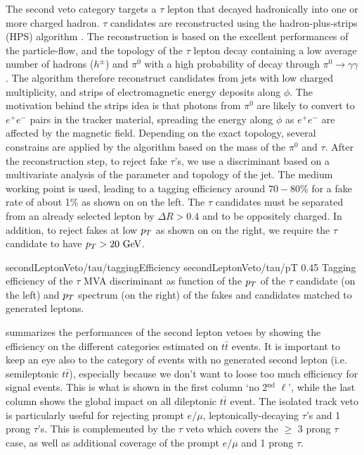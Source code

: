     The second veto category targets a $\tau$ lepton that decayed hadronically
    into one or more charged hadron. $\tau$ candidates are reconstructed using the
    hadron-plus-strips (HPS) algorithm \cite{TauID}. The reconstruction is based on the excellent
    performances of the particle-flow, and the topology of the $\tau$ lepton decay containing
    a low average number of hadrons ($h^\pm$) and $\pi^0$ with a high probability of decay
    through $\pi^0 \rightarrow \gamma\gamma$. The algorithm therefore reconstruct candidates
    from jets with low charged multiplicity, and strips of electromagnetic energy
    deposits along $\phi$. The motivation behind the strips idea is that photons from $\pi^0$
    are likely to convert to $e^+e^-$ pairs in the tracker material, spreading the energy
    along $\phi$ as $e^+e^-$ are affected by the magnetic field. Depending on the exact topology,
    several constrains are applied by the algorithm based on the mass of the $\pi^0$ and
    $\tau$. After the reconstruction step, to reject fake $\tau$'s, we use a discriminant
    based on a multivariate analysis of the parameter and topology of the jet. The medium
    working point is used, leading to a tagging efficiency around $70-80$\% for a fake
    rate of about 1\% as shown on  on the left. The $\tau$
    candidates must be separated from an already selected lepton by $\Delta R > 0.4$ and
    to be oppositely charged. In addition, to reject fakes at low $p_T$ as shown on
     on the right, we require the $\tau$ candidate to have
    $p_T > 20~\text{GeV}$.

                     {secondLeptonVeto/tau/taggingEfficiency}
                     {secondLeptonVeto/tau/pT}
                     {0.45}
                     {Tagging efficiency of the $\tau$ MVA discriminant as function of the
                     $p_T$ of the $\tau$ candidate (on the left) and $p_T$ spectrum (on the
                     right) of the fakes and candidates matched to generated leptons.}

     summarizes the performances of the
    second lepton vetoes by showing the efficiency on the different categories estimated on
    $t\bar{t}$ events. It is important to keep an eye also to the category of events with no
    generated second lepton (i.e. semileptonic $t\bar{t}$), especially because we don't
    want to loose too much efficiency for signal events. This is what is shown in the first
    column `no 2$^\text{nd}$ $\ell$', while the last column shows the global impact on all
    dileptonic $t\bar{t}$ event. The isolated track veto is particularly useful for rejecting
    prompt $e/\mu$, leptonically-decaying $\tau$'s and 1 prong $\tau$'s. This is complemented
    by the $\tau$ veto which covers the $\geq$ 3 prong $\tau$ case, as well as additional
    coverage of the prompt $e/\mu$ and 1 prong $\tau$.

